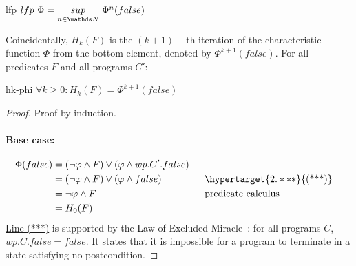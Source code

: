 \begin{theorem}{lfp}{\normalfont\cite{kaminski19}}
$lfp\ \Phi = \underset{n\in\N}{sup}\ \Phi^n(false)$
\end{theorem}


Coincidentally, $H_k(F)$ is the $(k+1)-$th iteration of the characteristic function $\Phi$ from the bottom element, denoted by $\Phi^{k+1}(false)$. 
For all predicates $F$ and all programs $C'$: 
\begin{lemma}{hk-phi}
$\forall k\geq 0: H_k(F)=\Phi^{k+1}(false)$
\end{lemma}

\begin{proof}
Proof by induction. 
\vspace{-0.25cm}\paragraph{Base case: } 
  \begin{align*} 
    \Phi(false)   & = (\neg\varphi\wedge F)\vee(\varphi\wedge wp.C'.false)  & \\ 
                  & = (\neg\varphi\wedge F)\vee(\varphi\wedge false)         && |\ \hypertarget{2.***}{\text{(***)}}\\
                  & = \neg\varphi\wedge F                                    && |\ \text{predicate calculus} \\
                  & = H_0(F)
  \end{align*}
\hyperlink{2.***}{Line (***)} is supported by the Law of Excluded Miracle~\cite[p.18]{dijkstra76}: for all programs $C$, $wp.C.false = false$. 
It states that it is impossible for a program to terminate in a state satisfying no postcondition. 


\end{proof}
